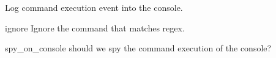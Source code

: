 Log command execution event into the console.

\begin{Configuration}

    \item[ignore]{Ignore the command that matches regex.}

    \item[spy\_on\_console]{should we spy the command execution of the console?}

\end{Configuration}


